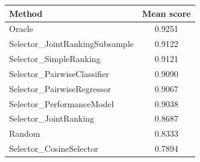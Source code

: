 \begin{tabular}{lc}
\toprule
Method & Mean score \\
\midrule
Oracle & 0.9251 \\
Selector\_JointRankingSubsample & 0.9122 \\
Selector\_SimpleRanking & 0.9121 \\
Selector\_PairwiseClassifier & 0.9090 \\
Selector\_PairwiseRegressor & 0.9067 \\
Selector\_PerformanceModel & 0.9038 \\
Selector\_JointRanking & 0.8687 \\
Random & 0.8333 \\
Selector\_CosineSelector & 0.7894 \\
\bottomrule
\end{tabular}
